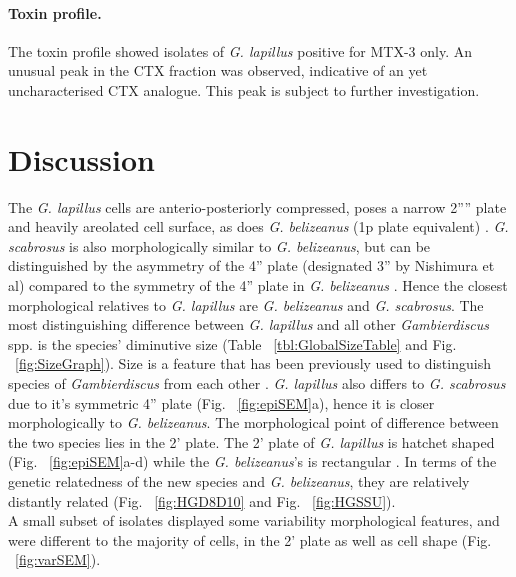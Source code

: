 \documentclass[12pt]{article}
\begin{document}
\paragraph{Toxin profile.}
The toxin profile showed isolates of \emph{G. lapillus} positive for MTX-3 only. 
An unusual peak in the CTX fraction was observed, indicative of an yet uncharacterised CTX analogue. 
This peak is subject to further investigation. 

\newpage
\section{Discussion}
The \emph{G. lapillus} cells are anterio-posteriorly compressed, poses a narrow 2'''' plate and heavily areolated cell surface, as does \emph{G. belizeanus} (1p plate equivalent)                                                                                                                                                                                           \citep{litaker2009taxonomy}.
 \emph{G. scabrosus} is also morphologically similar to \emph{G. belizeanus}, but can be distinguished by the asymmetry of the 4'' plate (designated 3'' by Nishimura et al) compared to the symmetry of the 4'' plate in \emph{G. belizeanus} \citep{nishimura2014morphology}. 
 Hence the closest morphological relatives to \emph{G. lapillus} are \emph{G. belizeanus} and \emph{G. scabrosus}. 
 The most distinguishing difference between \emph{G. lapillus} and all other \emph{Gambierdiscus} spp. is the species' diminutive size (Table ~\ref{tbl:GlobalSizeTable} and Fig. ~\ref{fig:SizeGraph}). 
 Size is a feature that has been previously used to distinguish species of \emph{Gambierdiscus} from each other \citep{litaker2009taxonomy}. 
\emph{G. lapillus} also differs to \emph{G. scabrosus} due to it's symmetric 4'' plate (Fig. ~\ref{fig:epiSEM}a), hence it is closer morphologically to \emph{G. belizeanus}. 
The morphological point of difference between the two species lies in the 2' plate. The 2' plate of \emph{G. lapillus} is hatchet shaped (Fig. ~\ref{fig:epiSEM}a-d) while the \emph{G. belizeanus}'s is rectangular \citep{faust1995observation}. 
In terms of the genetic relatedness of the new species and \textit{G. belizeanus}, they are relatively distantly related (Fig. ~\ref{fig:HGD8D10} and Fig. ~\ref{fig:HGSSU}). \\
A small subset of isolates displayed some variability morphological features, and were different to the majority of cells, in the 2' plate as well as cell shape (Fig. ~\ref{fig:varSEM}). 
\end{document}

